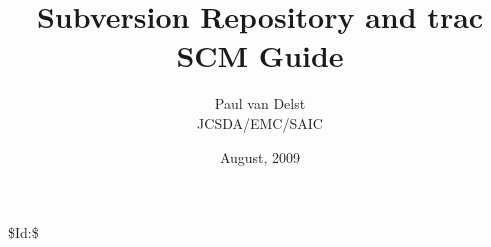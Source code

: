 



\newcommand{\f}[1]{\texttt{#1}}
\newcommand{\subversion}{\href{http://subversion.tigris.org/}{subversion}}
\newcommand{\trac}{\href{http://trac.edgewall.org/}{\textsf{trac}}}

\title{Subversion Repository and trac SCM Guide}
\author{Paul van Delst\\JCSDA/EMC/SAIC}
\date{August, 2009}



\maketitle


\setcounter{page}{1}
  \tableofcontents\newpage
  \listoffigures\newpage
  \listoftables\newpage
{}
\setcounter{page}{1}






\clearpage



\$Id:\$
\begin{appendix}
\end{appendix}



